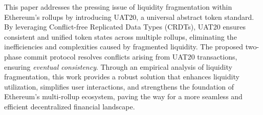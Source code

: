 
This paper addresses the pressing issue of liquidity fragmentation within Ethereum’s rollups by introducing UAT20, a universal abstract token standard. By leveraging Conflict-free Replicated Data Types (CRDTs), UAT20 ensures consistent and unified token states across multiple rollups, eliminating the inefficiencies and complexities caused by fragmented liquidity. The proposed two-phase commit protocol resolves conflicts arising from UAT20 transactions, ensuring \emph{eventual consistency}. Through an empirical analysis of liquidity fragmentation, this work provides a robust solution that enhances liquidity utilization, simplifies user interactions, and strengthens the foundation of Ethereum’s multi-rollup ecosystem, paving the way for a more seamless and efficient decentralized financial landscape.